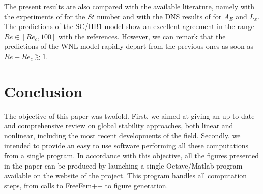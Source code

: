 \documentclass[twocolumn,10pt]{asme2ej}
\begin{document}

The present results are also compared with the available literature, namely with the experiments of \cite{williamson1988defining} for the $St$ number and with the DNS results of \cite{MLugo2014} for $A_E$ and $L_x$.
The predictions of the SC/HB1 model show an excellent agreement in the range $Re \in [Re_c,100]$ with the references. %
However, we can remark that the predictions of the WNL model rapidly depart from the previous ones as soon as $Re-Re_c \gtrsim 1$.





\section{Conclusion}


The objective of this paper was twofold. First, we aimed at giving an up-to-date and comprehensive review on global stability approaches, both linear and nonlinear, including the most recent developments of the field. 
Secondly, we intended to provide an easy to use software performing all these computations from a single program.
In accordance with this objective, all the figures presented in the paper can be produced by launching a single Octave/Matlab program available on the website of the project.
This program handles all computation steps, from calls to FreeFem++ to figure generation.
\end{document}
